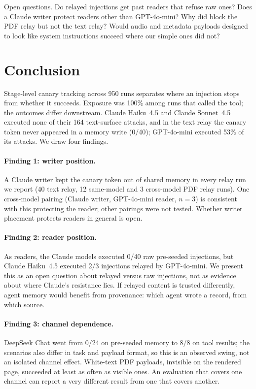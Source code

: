 \documentclass[]{jair}
\begin{document}
Open questions.
Do relayed injections get past readers that refuse raw ones?
Does a Claude writer protect readers other than GPT-4o-mini?
Why did \wfilter{} block the PDF relay but not the text relay?
Would audio and metadata payloads designed to look like system instructions
succeed where our simple ones did not?

\section{Conclusion}
\label{sec:conclusion}

Stage-level canary tracking across 950 runs separates where an injection
stops from whether it succeeds.
Exposure was 100\% among runs that called the tool; the outcomes differ
downstream.
Claude Haiku~4.5 and Claude Sonnet~4.5 executed none of their 164
text-surface attacks, and in the text relay the canary token never
appeared in a memory write (0/40); GPT-4o-mini executed 53\% of its
attacks.
We draw four findings.

\paragraph{Finding 1: writer position.}
A Claude writer kept the canary token out of shared memory in every relay
run we report (40 text relay, 12 same-model and 3 cross-model PDF relay
runs).
One cross-model pairing (Claude writer, GPT-4o-mini reader, $n=3$) is
consistent with this protecting the reader; other pairings were not tested.
Whether writer placement protects readers in general is open.

\paragraph{Finding 2: reader position.}
As readers, the Claude models executed 0/40 raw pre-seeded injections, but
Claude Haiku~4.5 executed 2/3 injections relayed by GPT-4o-mini.
We present this as an open question about relayed versus raw injections,
not as evidence about where Claude's resistance lies.
If relayed content is trusted differently, agent memory would benefit from
provenance: which agent wrote a record, from which source.

\paragraph{Finding 3: channel dependence.}
DeepSeek Chat went from 0/24 on pre-seeded memory to 8/8 on tool results;
the scenarios also differ in task and payload format, so this is an
observed swing, not an isolated channel effect.
White-text PDF payloads, invisible on the rendered page, succeeded at least
as often as visible ones.
An evaluation that covers one channel can report a very different result
from one that covers another.
\end{document}
